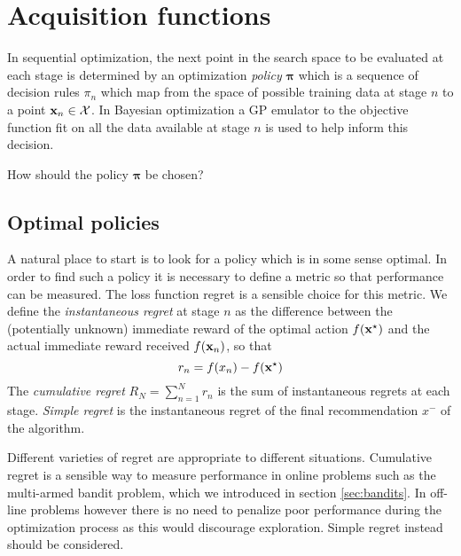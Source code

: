 
\chapter{Acquisition functions} %

\label{Chapter3} %


In sequential optimization, the next point in the search space to be evaluated at each stage is determined by an optimization \textit{policy} $\bm{\pi}$ which is a sequence of decision rules $\pi_n$ which map from the space of possible training data at stage $n$ to a point $\mathbf{x}_n \in \mathcal{X}$. In Bayesian optimization a GP emulator to the objective function fit on all the data available at stage $n$ is used to help inform this decision. 

How should the policy $\bm{\pi}$ be chosen?

\section{Optimal policies}

A natural place to start is to look for a policy which is in some sense optimal. In order to find such a policy it is necessary to define a metric so that performance can be measured. The loss function regret \citep{sugden} is a sensible choice \cite{srinivas2009gaussian} for this metric. We define the \textit{instantaneous regret} at stage $n$ as the difference between the (potentially unknown) immediate reward of the optimal action $f(\mathbf{x}^\star)$ and the actual immediate reward received $f(\mathbf{x}_n)$, so that
%
\begin{equation}
r_n = f(x_n) - f(\mathbf{x}^\star)
\end{equation}
%
The \textit{cumulative regret} $R_N = \sum_{n=1}^{N} r_n$ is the sum of instantaneous regrets at each stage. \textit{Simple regret} is the instantaneous regret of the final recommendation $x^-$ of the algorithm. 

Different varieties of regret are appropriate to different situations. Cumulative regret is a sensible way to measure performance in online problems such as the multi-armed bandit problem, which we introduced in section \ref{sec:bandits}. In off-line problems however there is no need to penalize poor performance during the optimization process as this would discourage exploration. Simple regret instead should be considered.

